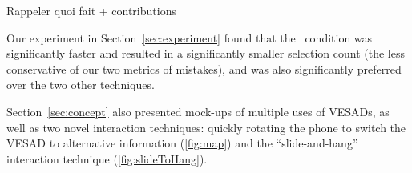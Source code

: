 Rappeler quoi fait + contributions

Our experiment in Section~\ref{sec:experiment} found that the \PhoneInArOut\ condition
was significantly faster and resulted in a significantly smaller
selection count (the less conservative of our two metrics of mistakes),
and was also significantly preferred over the two other techniques.


Section~\ref{sec:concept} also presented mock-ups of multiple uses of VESADs, as well as two novel interaction techniques: quickly rotating the phone to switch the VESAD to alternative information (\autoref{fig:map})
and the ``slide-and-hang'' interaction technique (\autoref{fig:slideToHang}).